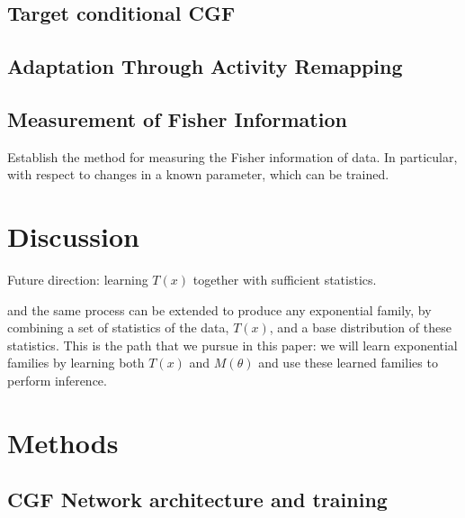 \documentclass[11pt]{article}      %
\begin{document}
\subsection{Target conditional CGF}





\subsection{Adaptation Through Activity Remapping}






\subsection{Measurement of Fisher Information}

Establish the method for measuring the Fisher information of data. In particular, with respect to changes in a known parameter, which can be trained.




\section{Discussion}

Future direction: learning $T(x)$ together with sufficient statistics.


and the same process can be extended to produce any exponential family, by combining a set of statistics of the data, $T(x)$, and a base distribution of these statistics.
This is the path that we pursue in this paper: we will learn exponential families by learning both $T(x)$ and $M(\theta)$ and use these learned families to perform inference.



\section{Methods}
\subsection{CGF Network architecture and training} \label{sec:network_architecture}
\end{document}
